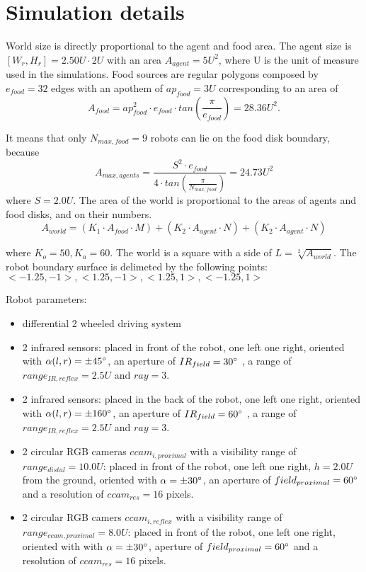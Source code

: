 

\section{Simulation details}
\label{Appendix:simulation}
World size is directly proportional to the agent and food area. The agent
size is $[W_{r},H_{r}]=2.50 U \cdot 2U$ with an area $A_{agent}=5 U^{2}$, where U is the unit of measure used in the simulations.
Food sources are regular polygons composed by $e_{food}=32$ edges with an apothem of $ap_{food}=3 U$ corresponding to an area of
\begin{equation}
A_{food}=ap_{food}^2 \cdot e_{food} \cdot tan(\frac{\pi}{e_{food}})=28.36 U^2.
\end{equation}

It means that only $N_{max,food}=9$ robots can lie on the food disk boundary, because
\begin{equation}
A_{max,agents}=\frac{S^{2} \cdot e_{food}}{4 \cdot tan(\frac{\pi}{N_{max,food}})}=24.73 U^{2}
\end{equation}
where $S=2.0 U$. The area of the world is proportional to the areas of agents and food disks, and on their numbers.
\begin{equation}
A_{world}=(K_{1} \cdot A_{food} \cdot M) + (K_{2} \cdot A_{agent} \cdot N) + (K_{2} \cdot A_{agent} \cdot N)
\end{equation}

where $K_{o}=50,K_{a}=60$. The world is a square with a side of $L=\sqrt[2]{A_{world}}$.
The robot boundary surface is delimeted by the following points: $<-1.25,-1>,<1.25,-1>,<1.25,1>,<-1.25,1>$

Robot parameters:
\begin{itemize}
\item differential 2 wheeled driving system
\item 2 infrared sensors: placed in front of the robot, one left one right,
oriented with $\alpha(l,r)=\pm45^{\circ}$, an aperture of $IR_{field}=30^{\circ}$ ,
a range of $range_{IR,reflex}=2.5 U$ and $ray=3$.

\item 2 infrared sensors: placed in the back of the robot, one left one right,
oriented with $\alpha(l,r)=\pm160^{\circ}$, an aperture of $IR_{field}=60^{\circ}$ ,
 a range of $range_{IR,reflex}=2.5 U$ and $ray=3$.

\item 2 circular RGB cameras $ccam_{i,proximal}$ with a visibility range of
 $range_{distal}=10.0 U$: placed in front of the robot, one left one right, $h=2.0 U$
from the ground, oriented with $\alpha=\pm30^{\circ}$, an aperture of
$field_{proximal}=60^{\circ}$  and a resolution of $ccam_{res}=16$ pixels.
\item 2 circular RGB camers $ccam_{i,reflex}$ with a visibility range of
$range_{ccam,proximal}=8.0 U$: placed in front of the robot, one left one right,
oriented with with $\alpha=\pm30^{\circ}$, aperture of $field_{proximal}=60^{\circ}$
and a resolution of $ccam_{res}=16$ pixels.
\end{itemize}


